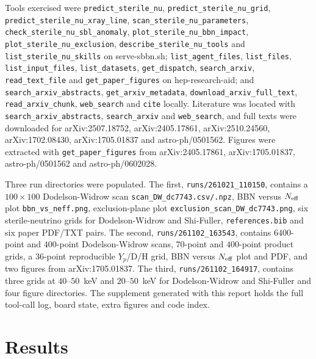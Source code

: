 \documentclass[11pt,a4paper]{article}
\begin{document}
Tools exercised were \texttt{predict\_sterile\_nu}, \texttt{predict\_sterile\_nu\_grid}, \texttt{predict\_sterile\_nu\_xray\_line}, \texttt{scan\_sterile\_nu\_parameters}, \texttt{check\_sterile\_nu\_sbl\_anomaly}, \texttt{plot\_sterile\_nu\_bbn\_impact}, \texttt{plot\_sterile\_nu\_exclusion}, \texttt{describe\_sterile\_nu\_tools} and \texttt{list\_sterile\_nu\_skills} on serve-sbbn.sh; \texttt{list\_agent\_files}, \texttt{list\_files}, \texttt{list\_input\_files}, \texttt{list\_datasets}, \texttt{get\_dispatch}, \texttt{search\_arxiv}, \texttt{read\_text\_file} and \texttt{get\_paper\_figures} on hep-research-aid; and \texttt{search\_arxiv\_abstracts}, \texttt{get\_arxiv\_metadata}, \texttt{download\_arxiv\_full\_text}, \texttt{read\_arxiv\_chunk}, \texttt{web\_search} and \texttt{cite} locally. Literature was located with \texttt{search\_arxiv\_abstracts}, \texttt{search\_arxiv} and \texttt{web\_search}, and full texts were downloaded for arXiv:2507.18752, arXiv:2405.17861, arXiv:2510.24560, arXiv:1702.08430, arXiv:1705.01837 and astro-ph/0501562. Figures were extracted with \texttt{get\_paper\_figures} from arXiv:2405.17861, arXiv:1705.01837, astro-ph/0501562 and astro-ph/0602028.

Three run directories were populated. The first, \texttt{runs/261021\_110150}, contains a $100\times100$ Dodelson-Widrow scan \texttt{scan\_DW\_dc7743.csv/.npz}, BBN versus $N_{\rm eff}$ plot \texttt{bbn\_vs\_neff.png}, exclusion-plane plot \texttt{exclusion\_scan\_DW\_dc7743.png}, six sterile-neutrino grids for Dodelson-Widrow and Shi-Fuller, \texttt{references.bib} and six paper PDF/TXT pairs. The second, \texttt{runs/261102\_163543}, contains $6400$-point and $400$-point Dodelson-Widrow scans, $70$-point and $400$-point product grids, a $36$-point reproducible $Y_{p}$/D/H grid, BBN versus $N_{\rm eff}$ plot and PDF, and two figures from arXiv:1705.01837. The third, \texttt{runs/261102\_164917}, contains three grids at $40$--$50$~keV and $20$--$50$~keV for Dodelson-Widrow and Shi-Fuller and four figure directories. The supplement generated with this report holds the full tool-call log, board state, extra figures and code index.

\section{Results}
\end{document}

